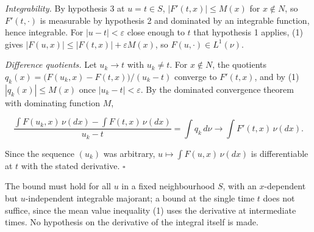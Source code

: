 \documentclass[11pt,a4paper]{article}
\begin{document}
\emph{Integrability.} By hypothesis 3 at \(u=t\in S\), \(|F'(t,x)|\le M(x)\) for \(x\notin N\), so \(F'(t,\cdot)\) is measurable by hypothesis 2 and dominated by an integrable function, hence integrable. For \(|u-t|<\varepsilon\) close enough to \(t\) that hypothesis 1 applies, (1) gives \(|F(u,x)|\le|F(t,x)|+\varepsilon M(x)\), so \(F(u,\cdot)\in L^1(\nu)\).




\emph{Difference quotients.} Let \(u_k\to t\) with \(u_k\neq t\). For \(x\notin N\), the quotients \(q_k(x)=\bigl(F(u_k,x)-F(t,x)\bigr)/(u_k-t)\) converge to \(F'(t,x)\), and by (1) \(|q_k(x)|\le M(x)\) once \(|u_k-t|<\varepsilon\). By the dominated convergence theorem with dominating function \(M\),


\[\frac{\int F(u_k,x)\,\nu(dx)-\int F(t,x)\,\nu(dx)}{u_k-t}=\int q_k\,d\nu\longrightarrow\int F'(t,x)\,\nu(dx).\]


Since the sequence \((u_k)\) was arbitrary, \(u\mapsto\int F(u,x)\,\nu(dx)\) is differentiable at \(t\) with the stated derivative. \(\square\)




The bound must hold for all \(u\) in a fixed neighbourhood \(S\), with an \(x\)-dependent but \(u\)-independent integrable majorant; a bound at the single time \(t\) does not suffice, since the mean value inequality (1) uses the derivative at intermediate times. No hypothesis on the derivative of the integral itself is made.
\end{document}
